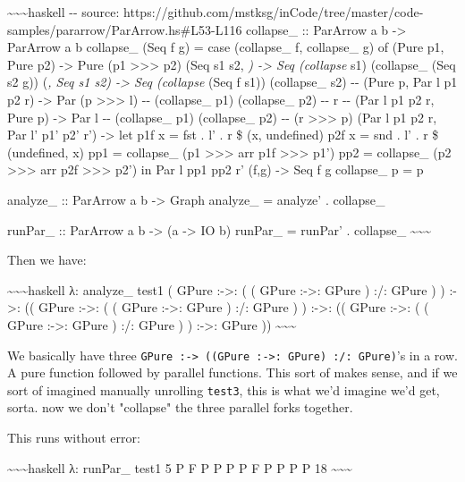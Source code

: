 \documentclass[]{article}
\begin{document}
\textasciitilde{}\textasciitilde{}\textasciitilde{}haskell -\/- source:
https://github.com/mstksg/inCode/tree/master/code-samples/pararrow/ParArrow.hs\#L53-L116
collapse\_ :: ParArrow a b -\textgreater{} ParArrow a b collapse\_ (Seq f g) =
case (collapse\_ f, collapse\_ g) of (Pure p1, Pure p2) -\textgreater{} Pure (p1
\textgreater{}\textgreater{}\textgreater{} p2) (Seq s1 s2, \emph{)
-\textgreater{} Seq (collapse} s1) (collapse\_ (Seq s2 g)) (\emph{, Seq s1 s2)
-\textgreater{} Seq (collapse} (Seq f s1)) (collapse\_ s2) -\/- (Pure p, Par l
p1 p2 r) -\textgreater{} Par (p \textgreater{}\textgreater{}\textgreater{} l)
-\/- (collapse\_ p1) (collapse\_ p2) -\/- r -\/- (Par l p1 p2 r, Pure p)
-\textgreater{} Par l -\/- (collapse\_ p1) (collapse\_ p2) -\/- (r
\textgreater{}\textgreater{}\textgreater{} p) (Par l p1 p2 r, Par l' p1' p2' r')
-\textgreater{} let p1f x = fst . l' . r \$ (x, undefined) p2f x = snd . l' . r
\$ (undefined, x) pp1 = collapse\_ (p1
\textgreater{}\textgreater{}\textgreater{} arr p1f
\textgreater{}\textgreater{}\textgreater{} p1') pp2 = collapse\_ (p2
\textgreater{}\textgreater{}\textgreater{} arr p2f
\textgreater{}\textgreater{}\textgreater{} p2') in Par l pp1 pp2 r' (f,g)
-\textgreater{} Seq f g collapse\_ p = p

analyze\_ :: ParArrow a b -\textgreater{} Graph analyze\_ = analyze' .
collapse\_

runPar\_ :: ParArrow a b -\textgreater{} (a -\textgreater{} IO b) runPar\_ =
runPar' . collapse\_ \textasciitilde{}\textasciitilde{}\textasciitilde{}

Then we have:

\textasciitilde{}\textasciitilde{}\textasciitilde{}haskell λ: analyze\_ test1 (
GPure :-\textgreater{}: ( ( GPure :-\textgreater{}: GPure ) :/: GPure ) )
:-\textgreater{}: (( GPure :-\textgreater{}: ( ( GPure :-\textgreater{}: GPure )
:/: GPure ) ) :-\textgreater{}: (( GPure :-\textgreater{}: ( ( GPure
:-\textgreater{}: GPure ) :/: GPure ) ) :-\textgreater{}: GPure ))
\textasciitilde{}\textasciitilde{}\textasciitilde{}

We basically have three
\texttt{GPure\ :-\textgreater{}\ ((GPure\ :-\textgreater{}:\ GPure)\ :/:\ GPure)}'s
in a row. A pure function followed by parallel functions. This sort of makes
sense, and if we sort of imagined manually unrolling \texttt{test3}, this is
what we'd imagine we'd get, sorta. now we don't "collapse" the three parallel
forks together.

This runs without error:

\textasciitilde{}\textasciitilde{}\textasciitilde{}haskell λ: runPar\_ test1 5 P
F P P P P F P P P P 18 \textasciitilde{}\textasciitilde{}\textasciitilde{}
\end{document}
